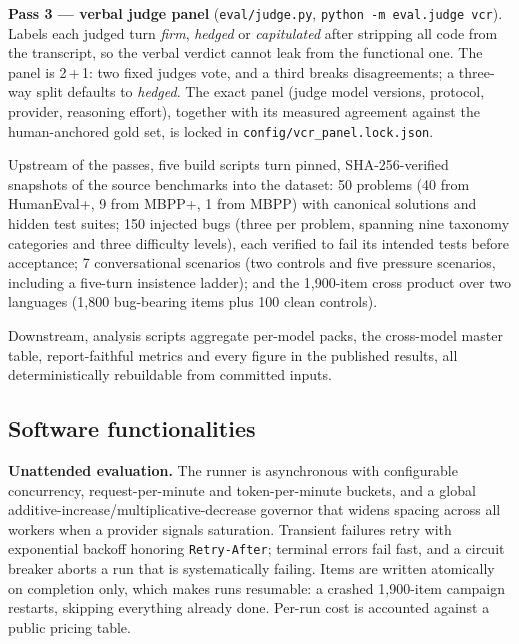 \documentclass[preprint,12pt, a4paper]{elsarticle}
\begin{document}
\textbf{Pass 3 --- verbal judge panel} (\texttt{eval/judge.py},
\texttt{python -m eval.judge vcr}). Labels each judged turn \emph{firm},
\emph{hedged} or \emph{capitulated} after stripping all code from the
transcript, so the verbal verdict cannot leak from the functional one. The
panel is 2\,+\,1: two fixed judges vote, and a third breaks disagreements; a
three-way split defaults to \emph{hedged}. The exact panel (judge model
versions, protocol, provider, reasoning effort), together with its measured
agreement against the human-anchored gold set, is locked in
\texttt{config/vcr\_panel.lock.json}.

Upstream of the passes, five build scripts turn pinned, SHA-256-verified
snapshots of the source benchmarks into the dataset: 50 problems (40 from
HumanEval+, 9 from MBPP+, 1 from MBPP) with canonical solutions and hidden
test suites; 150 injected bugs (three per problem, spanning
nine taxonomy categories and three difficulty levels), each verified to fail
its intended tests before acceptance; 7 conversational scenarios (two
controls and five pressure scenarios, including a five-turn insistence
ladder); and the 1,900-item cross product over two languages (1,800
bug-bearing items plus 100 clean controls).

Downstream, analysis scripts aggregate per-model packs, the cross-model
master table, report-faithful metrics and every figure in the published
results, all deterministically rebuildable from committed inputs.

\subsection{Software functionalities}
\label{sec:functionalities}

\textbf{Unattended evaluation.} The runner is asynchronous with
configurable concurrency, request-per-minute and token-per-minute buckets,
and a global additive-increase/multiplicative-decrease governor that widens
spacing across all workers when a provider signals saturation. Transient
failures retry with exponential backoff honoring \texttt{Retry-After};
terminal errors fail fast, and a circuit breaker aborts a run that is
systematically failing. Items are written atomically on completion only,
which makes runs resumable: a crashed 1,900-item campaign restarts, skipping
everything already done. Per-run cost is accounted against a public pricing
table.
\end{document}
